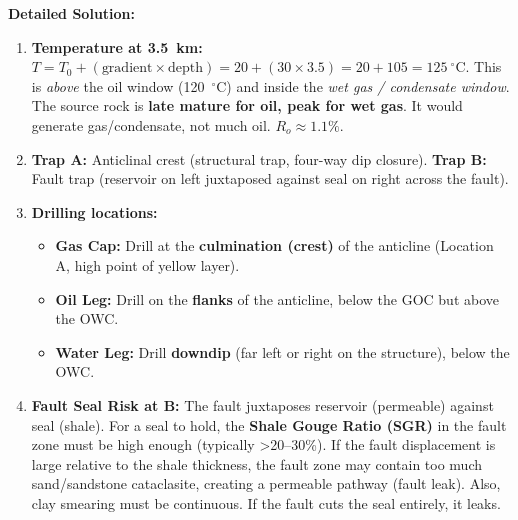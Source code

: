 \documentclass[11pt]{article}
\begin{document}
\begin{exoresolu}
\tcblower
\textbf{Detailed Solution:}
\begin{enumerate}
    \item \textbf{Temperature at \SI{3.5}{\kilo\meter}:} $T = T_0 + (\text{gradient} \times \text{depth}) = 20 + (30 \times 3.5) = 20 + 105 = \SI{125}{\ensuremath{{}^{\circ}\mathrm{C}}}$.
    This is \emph{above} the oil window (\SI{120}{\ensuremath{{}^{\circ}\mathrm{C}}}) and inside the \emph{wet gas / condensate window}. The source rock is \textbf{late mature for oil, peak for wet gas}. It would generate gas/condensate, not much oil. $R_o \approx 1.1\%$.
    \item \textbf{Trap A:} Anticlinal crest (structural trap, four-way dip closure). \textbf{Trap B:} Fault trap (reservoir on left juxtaposed against seal on right across the fault).
    \item \textbf{Drilling locations:}
        \begin{itemize}
            \item \textbf{Gas Cap:} Drill at the \textbf{culmination (crest)} of the anticline (Location A, high point of yellow layer).
            \item \textbf{Oil Leg:} Drill on the \textbf{flanks} of the anticline, below the GOC but above the OWC.
            \item \textbf{Water Leg:} Drill \textbf{downdip} (far left or right on the structure), below the OWC.
        \end{itemize}
    \item \textbf{Fault Seal Risk at B:} The fault juxtaposes reservoir (permeable) against seal (shale). For a seal to hold, the \textbf{Shale Gouge Ratio (SGR)} in the fault zone must be high enough (typically \textgreater 20--30\%). If the fault displacement is large relative to the shale thickness, the fault zone may contain too much sand/sandstone cataclasite, creating a permeable pathway (fault leak). Also, clay smearing must be continuous. If the fault cuts the seal entirely, it leaks.
\end{enumerate}
\end{exoresolu}
\end{document}
